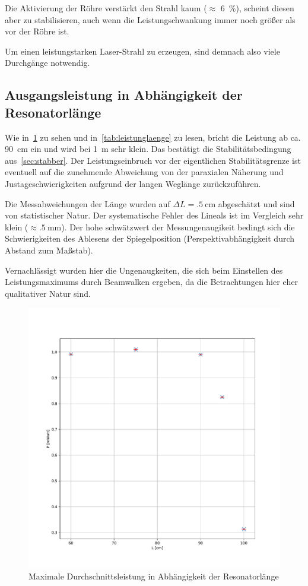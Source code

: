 \documentclass[slug=GL, room=HZDR\ Dresden/Rossendorf\,\ Geb.\ 620/123, supervisor=Tim\ Ziegler]{../../Lab_Report_LaTeX/lab_report}
\begin{document}
Die Aktivierung der R\"ohre verst\"arkt den Strahl kaum (\(\approx\)
\SI{6}{\percent}), scheint diesen aber zu stabilisieren, auch wenn die
Leistungschwankung immer noch gr\"o\ss{}er als vor der R\"ohre ist.

Um einen leistungstarken Laser-Strahl zu erzeugen, sind demnach also
viele Durchg\"ange notwendig.

\subsection{Ausgangsleistung in Abh\"angigkeit der Resonatorl\"ange}

Wie in~\ref{fig:power-over-l} zu sehen und in~\ref{tab:leistunglaenge}
zu lesen, bricht die Leistung ab
ca. \SI{90}{\centi\meter} ein und wird bei \SI{1}{\meter} sehr klein.
Das best\"atigt die Stabilit\"atsbedingung aus~\ref{sec:stabber}. Der
Leistungseinbruch vor der eigentlichen Stabilit\"atsgrenze ist
eventuell auf die zunehmende Abweichung von der paraxialen N\"aherung
und Justageschwierigkeiten aufgrund der langen Wegl\"ange
zur\"uckzuf\"uhren.

Die Messabweichungen der L\"ange wurden auf \(\Delta L = \SI{.5}{\centi\meter}\)
abgesch\"atzt und sind von statistischer Natur. Der systematische
Fehler des Lineals ist im Vergleich sehr klein (\(\approx
\SI{.5}{\milli\meter}\)). Der hohe schw\"atzwert der Messungenaugikeit
bedingt sich die Schwierigkeiten des Ablesens der Spiegelposition
(Perspektivabh\"angigkeit durch Abstand zum Ma\ss{}stab).


Vernachl\"assigt wurden hier die Ungenaugkeiten, die sich beim
Einstellen des Leistungsmaximums durch Beamwalken ergeben, da die
Betrachtungen hier eher qualitativer Natur sind.

\begin{figure}[h]\centering
  \includegraphics[width=.8\columnwidth]{figs/power-over-l.pdf}
  \caption{Maximale Durchschnittsleistung in Abh\"angigkeit der Resonatorl\"ange }
  \label{fig:power-over-l}
\end{figure}
\end{document}
